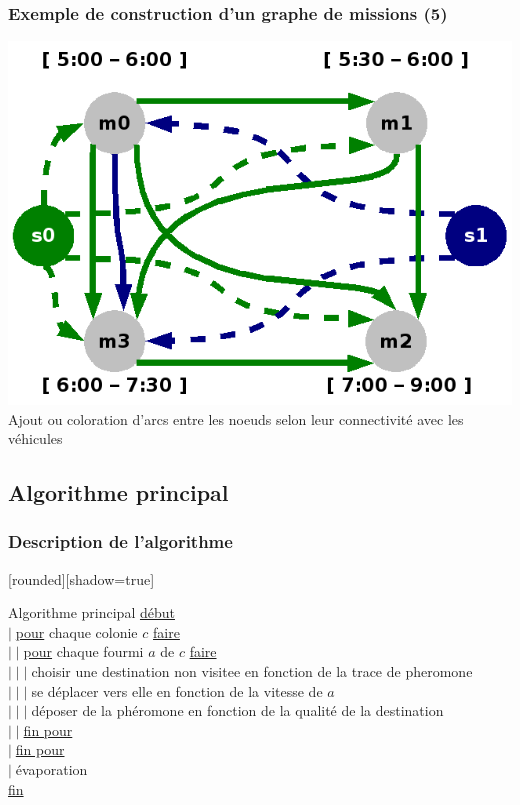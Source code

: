 \documentclass{beamer}
\begin{document}
\begin{frame}
	\frametitle{Exemple de construction d'un graphe de missions (5)}
 	\begin{center}
 		\includegraphics[height=.50\textheight]{fig/missionGraphComplet.png}\\
		Ajout ou coloration d'arcs entre les noeuds selon leur connectivité avec les véhicules
	\end{center}
\end{frame}
\subsection*{Algorithme principal}

\begin{frame}
\frametitle{Description de l'algorithme}
	[rounded][shadow=true]
	\small
	\begin{block}{Algorithme principal}
	\underline{début}\\
	$\vert \;$\underline{pour} chaque colonie $c$ \underline{faire}\\
	$\vert \;\vert \;$\underline{pour} chaque fourmi $a$ de $c$ \underline{faire}\\
	$\vert \;\vert \;\vert \;$choisir une destination non visitee en fonction de la trace de pheromone\\
	$\vert \;\vert \;\vert \;$se déplacer vers elle en fonction de la vitesse de $a$\\
	$\vert \;\vert \;\vert \;$déposer de la phéromone en fonction de la qualité de la destination\\
	$\vert \;\vert \;$\underline{fin pour}\\
	$\vert \;$\underline{fin pour}\\
	$\vert \;$évaporation\\
	\underline{fin}\\
	\end{block}
	\normalsize
\end{frame}
\end{document}
